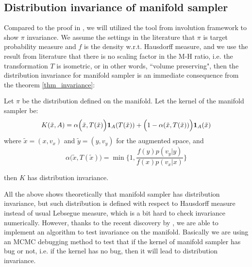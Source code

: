 \documentclass{article}
\begin{document}
\subsection{Distribution invariance of manifold sampler}
Compared to the proof in \cite{manifoldparent}, we will utilized the tool from involution framework to show $\pi$ invariance. We assume the settings in the literature that $\pi$ is target probability measure and $f$ is the density w.r.t. Hausdorff measure, and we use the result from literature that there is no scaling factor in the M-H ratio, i.e. the transformation $T$ is isometric, or in other words, ``volume preserving", then the distribution invariance for manifold sampler is an immediate consequence from the theorem \ref{thm_invariance}:
\begin{corollary}
Let $\pi$ be the distribution defined on the manifold. Let the kernel of the manifold sampler be:
\[K(\tilde{x}, A) = \alpha\Big(\tilde{x}, T(\tilde{x})\Big){\mathbf 1}_A(T(\tilde{x})) + \Big(1- \alpha(\tilde{x}, T(\tilde{x}))\Big){\mathbf 1}_A(\tilde{x})\]where $\tilde{x} = (x, v_x)$ and $\tilde{y} = (y, v_y)$ for the augmented space, and \[\alpha\Big(\tilde{x}, T(\tilde{x})\Big) = \min\Big\{1, \frac{f(y)p(v_y|y)}{f(x)p(v_x|x)}\Big\}\]

then $K$ has distribution invariance.
\end{corollary}







All the above shows theoretically that manifold sampler has distribution invariance, but such distribution is defined with respect to Hausdorff measure instead of usual Lebsegue measure, which is a bit hard to check invariance numerically. However, thanks to the recent discovery by \cite{ratest}, we are able to implement an algorithm to test invariance on the manifold. Basically we are using an MCMC debugging method to test that if the kernel of manifold sampler has bug or not, i.e. if the kernel has no bug, then it will lead to distribution invariance.
\end{document}
